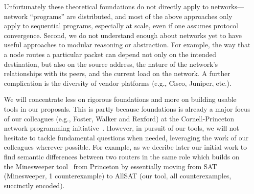 Unfortunately these theoretical foundations do not directly apply to networks---network ``programs'' are distributed, and most of the above approaches only apply to sequential programs, especially at scale, even if one assumes protocol convergence. Second, we do not understand enough about networks yet to have useful approaches to modular reasoning or abstraction.  For example, the way that a node routes a particular packet can depend not only on the intended destination, but also on the source address, the nature of the network's relationships with its peers, and the current load on the network.  A further complication is the diversity of vendor platforms (e.g., Cisco, Juniper, etc.).

We will concentrate less on rigorous foundations and more on building usable tools in our proposals. This is partly because foundations is already a major focus of our colleagues (e.g., Foster, Walker and Rexford) at the Cornell-Princeton network programming initiative~\cite{cornellcenter}.  However, in
pursuit of our tools, we will not hesitate  to tackle fundamental questions when needed, leveraging the work of our colleagues wherever possible.  For example, as we decribe later our initial work to find semantic differences between two routers in the same role which builds on the Minesweeper tool~\cite{minesweeper} from Princeton by essentially moving from SAT (Minesweeper, 1 counterexample)
to AllSAT (our tool, all counterexamples, succinctly encoded).
